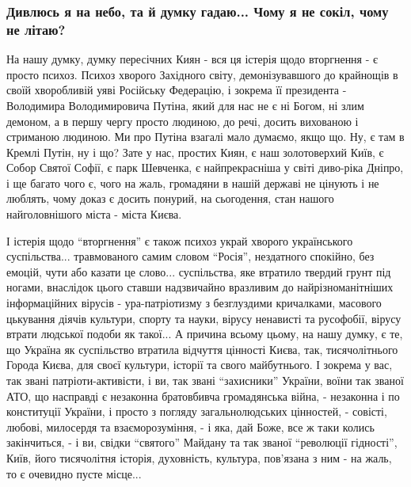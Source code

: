  
 
 
 
 

\clearpage
\subsubsection{Дивлюсь я на небо, та й думку гадаю... Чому я не сокіл, чому не
літаю?}

На нашу думку, думку пересічних Киян - вся ця істерія щодо вторгнення - є
просто психоз. Психоз хворого Західного світу, демонізувавшого до крайнощів в
своїй хворобливій уяві Російську Федерацію, і зокрема її президента -
Володимира Володимировича Путіна, який для нас не є ні Богом, ні злим демоном,
а в першу чергу просто людиною, до речі, досить вихованою і стриманою людиною.
Ми про Путіна взагалі мало думаємо, якщо що. Ну, є там в Кремлі Путін, ну і що?
Зате у нас, простих Киян, є наш золотоверхий Київ, є Собор Святої Софії, є парк
Шевченка, є найпрекрасніша у світі диво-ріка Дніпро, і ще багато чого є, чого
на жаль, громадяни в нашій державі не цінують і не люблять, чому доказ є досить
понурий, на сьогодення, стан нашого найголовнішого міста - міста Києва.

І істерія щодо \enquote{вторгнення} є також психоз украй хворого українського
суспільства... травмованого самим словом \enquote{Росія}, нездатного спокійно,
без емоцій, чути або казати це слово... суспільства, яке втратило твердий грунт
під ногами, внаслідок цього ставши надзвичайно вразливим до найрізноманітніших
інформаційних вірусів - ура-патріотизму з безглуздими кричалками, масового
цькування діячів культури, спорту та науки, вірусу ненависті та русофобії,
вірусу втрати людської подоби як такої... А причина всьому цьому, на нашу
думку, є те, що Україна як суспільство втратила відчуття цінності Києва, так,
тисячолітнього Города Києва, для своєї культури, історії та свого майбутнього.
І зокрема у вас, так звані патріоти-активісти, і ви, так звані
\enquote{захисники} України, воїни так званої АТО, що насправді є незаконна
братовбивча громадянська війна, - незаконна і по конституції України, і просто
з погляду загальнолюдських цінностей, - совісті, любові, милосердя та
взаєморозуміння, - і яка, дай Боже, все ж таки колись закінчиться, - і ви,
свідки \enquote{святого} Майдану та так званої \enquote{революції гідності},
Київ, його тисячолітня історія, духовність, культура, пов'язана з ним - на
жаль, то є очевидно пусте місце...

